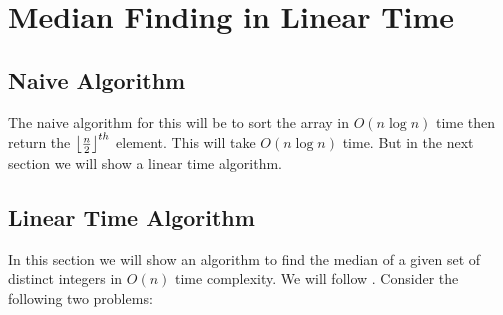 \chapter{Median Finding in Linear Time}

\begin{algoprob}
\end{algoprob}

\section{Naive Algorithm}
The naive algorithm for this will be to sort the array in $O(n\log n)$ time then return the  $\left\lfloor\frac{n}{2}\right\rfloor^{th}$ element. This will take $O(n\log n)$ time. But in the next section we will show a linear time algorithm.

\section{Linear Time Algorithm}
In this section we will show an algorithm to find the median of a given set of distinct integers in $O(n)$ time complexity. We will follow \cite[Section 9.3]{CormenThomasLeisersonCharlesRivestRonaldSteinClifford_BOOK}. Consider the following two problems:

\begin{algoprob}
\end{algoprob}
\begin{algoprob}
\end{algoprob}

